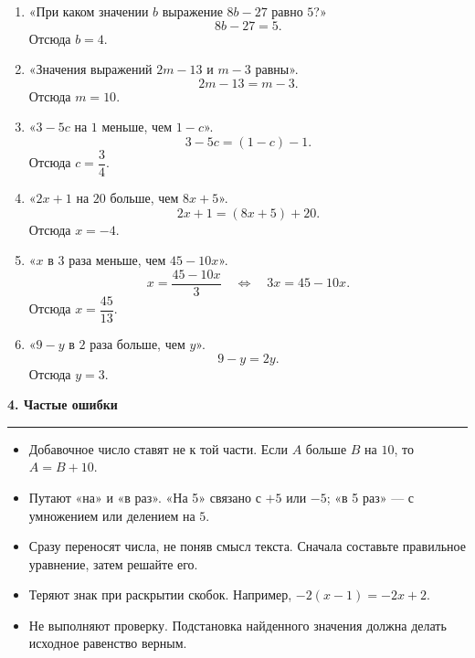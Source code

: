 \documentclass[a4paper,12pt]{article}
\newcommand{\sectiontitle}[1]{%
  \vspace{0.4em}%
  {\Large\bfseries\color{darkaccent}#1}\par
  \vspace{0.35em}%
  {\color{accent}\rule{\linewidth}{0.7pt}}\par
  \vspace{0.5em}%
}
\begin{document}
\begin{enumerate}
  \item «При каком значении $b$ выражение $8b-27$ равно $5$?»
  \[
  8b-27=5.
  \]
  Отсюда $b=4$.

  \item «Значения выражений $2m-13$ и $m-3$ равны».
  \[
  2m-13=m-3.
  \]
  Отсюда $m=10$.

  \item «$3-5c$ на $1$ меньше, чем $1-c$».
  \[
  3-5c=(1-c)-1.
  \]
  Отсюда $c=\dfrac34$.

  \item «$2x+1$ на $20$ больше, чем $8x+5$».
  \[
  2x+1=(8x+5)+20.
  \]
  Отсюда $x=-4$.

  \item «$x$ в $3$ раза меньше, чем $45-10x$».
  \[
  x=\frac{45-10x}{3}
  \quad\Longleftrightarrow\quad
  3x=45-10x.
  \]
  Отсюда $x=\dfrac{45}{13}$.

  \item «$9-y$ в $2$ раза больше, чем $y$».
  \[
  9-y=2y.
  \]
  Отсюда $y=3$.
\end{enumerate}

\sectiontitle{4. Частые ошибки}

\begin{itemize}
  \item Добавочное число ставят не к той части. Если $A$ больше $B$ на $10$, то $A=B+10$.
  \item Путают «на» и «в раз». «На 5» связано с $+5$ или $-5$; «в 5 раз» — с умножением или делением на $5$.
  \item Сразу переносят числа, не поняв смысл текста. Сначала составьте правильное уравнение, затем решайте его.
  \item Теряют знак при раскрытии скобок. Например, $-2(x-1)=-2x+2$.
  \item Не выполняют проверку. Подстановка найденного значения должна делать исходное равенство верным.
\end{itemize}
\end{document}
